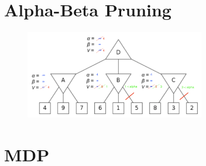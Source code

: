 \documentclass{article}
\begin{document}
\section{Alpha-Beta Pruning}

\begin{figure}[h] 
    \begin{center}
        \includegraphics[width=0.7\textwidth]{img/alphaBeta.png} 
    \end{center}
\end{figure}

\newpage

\section{MDP}
\end{document}
